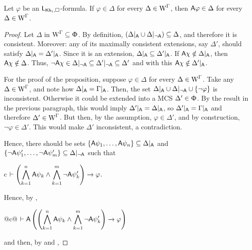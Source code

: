 \begin{proposition}\label{pro:cm-ults-khiml-allall}
Let $\varphi$ be an $\mathsf{L}_{{\sf Kh}_i,\square}$-formula. If $\varphi \in \Delta$ for every $\Delta \in \operatorname{W}^\Gamma$, then ${\sf A}\varphi \in \Delta$ for every $\Delta \in \operatorname{W}^\Gamma$.
\end{proposition}

\begin{proof}
Let $\Delta$ in $\operatorname{W}^\Gamma \subseteq \Upphi$. By definition, $(\Delta\vert_{{\sf A}} \cup \Delta\vert_{\lnot{\sf A}}) \subseteq \Delta$, and therefore it is consistent.
Moreover: any of its maximally consistent extensions, say $\Delta'$, should satisfy $\Delta\vert_{{\sf A}} = \Delta'\vert_{{\sf A}}$.
Since it is an extension, $\Delta\vert_{{\sf A}} \subseteq \Delta'\vert_{{\sf A}}$.
If ${\sf A}\chi \notin \Delta\vert_{{\sf A}}$, then ${\sf A}\chi \notin \Delta$.
Thus, $\neg{\sf A}\chi \in \Delta\vert_{\lnot{\sf A}} \subseteq \Delta'\vert_{\lnot{\sf A}} \subseteq \Delta'$ and with this ${\sf A}\chi \notin \Delta'\vert_{{\sf A}}$.

For the proof of the proposition, suppose $\varphi \in \Delta$ for every $\Delta \in \operatorname{W}^\Gamma$.
Take any $\Delta \in \operatorname{W}^\Gamma$, and note how $\Delta\vert_{{\sf A}} = \Gamma\vert_{{\sf A}}$.
Then, the set $\Delta\vert_{{\sf A}} \cup \Delta\vert_{\lnot{\sf A}} \cup \{ \lnot \varphi \}$ is inconsistent. Otherwise it could be extended into a MCS $\Delta' \in \Upphi$.
By the result in the previous paragraph, this would imply $\Delta'\vert_{{\sf A}} = \Delta\vert_{{\sf A}}$, so $\Delta'\vert_{{\sf A}} = \Gamma\vert_{{\sf A}}$ and therefore $\Delta' \in \operatorname{W}^\Gamma$. But then, by the assumption, $\varphi \in \Delta'$, and by construction, $\lnot \varphi \in \Delta'$.
This would make $\Delta'$ inconsistent, a contradiction.

Hence, there should be sets $\{ {\sf A}\psi_1, \ldots, {\sf A}\psi_n \} \subseteq \Delta\vert_{{\sf A}}$ and $\{ \lnot {\sf A}\psi'_1, \ldots, \lnot {\sf A}\psi'_m \} \subseteq \Delta\vert_{\lnot{\sf A}}$ such that

\begin{ctabular}{c}
$\vdash
\displaystyle
\left( \bigwedge_{k=1}^{n} {\sf A}\psi_k \land \bigwedge_{k=1}^{m} \lnot {\sf A}\psi'_k \right)
\rightarrow \varphi$.
\end{ctabular}

Hence, by ,

\begin{ctabular}{@{}c@{}}
$\vdash
\displaystyle
{\sf A}
\left(
\left( \bigwedge_{k=1}^{n} {\sf A}\psi_k \land \bigwedge_{k=1}^{m} \lnot {\sf A}\psi'_k \right)
\rightarrow \varphi
\right)$
\end{ctabular}

and then, by  and ,


\end{proof}
